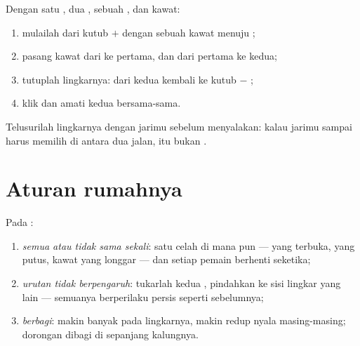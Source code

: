 \begin{method}[Membangunnya]\label{met:g4:series-circuits:build}
Dengan satu , dua , sebuah , dan kawat:
\begin{enumerate}
  \item mulailah dari kutub $+$  dengan sebuah kawat menuju
        ;
  \item pasang kawat dari  ke  pertama, dan dari 
        pertama ke  kedua;
  \item tutuplah lingkarnya: dari  kedua kembali ke kutub $-$
        ;
  \item klik  dan amati kedua  bersama-sama.
\end{enumerate}
Telusurilah lingkarnya dengan jarimu sebelum menyalakan: kalau jarimu
sampai harus memilih di antara dua jalan, itu bukan .
\end{method}

\section{Aturan rumahnya}

\begin{proposition}\label{prop:g4:series-circuits:rules}
Pada :
\begin{enumerate}
  \item \emph{semua atau tidak sama sekali}: satu celah di mana pun
        ---  yang terbuka,  yang putus, kawat yang
        longgar --- dan setiap pemain berhenti seketika;
  \item \emph{urutan tidak berpengaruh}: tukarlah kedua ,
        pindahkan  ke sisi lingkar yang lain --- semuanya
        berperilaku persis seperti sebelumnya;
  \item \emph{berbagi}: makin banyak  pada lingkarnya, makin
        redup nyala masing-masing; dorongan  dibagi di
        sepanjang kalungnya.
\end{enumerate}
\end{proposition}

